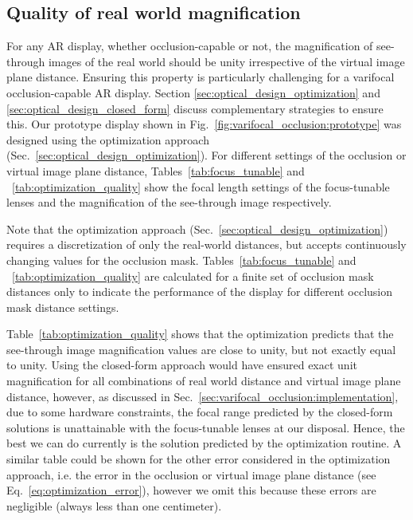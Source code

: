 \subsection{Quality of real world magnification}
\label{sec:results_optimization_quality}
For any AR display, whether occlusion-capable or not, the magnification of see-through images of the real world should be unity irrespective of the virtual image plane distance. Ensuring this property is particularly challenging for a varifocal occlusion-capable AR display. Section \ref{sec:optical_design_optimization} and \ref{sec:optical_design_closed_form} discuss complementary strategies to ensure this. Our prototype display shown in Fig.~\ref{fig:varifocal_occlusion:prototype} was designed using the optimization approach (Sec.~\ref{sec:optical_design_optimization}). For different settings of the occlusion or virtual image plane distance, Tables~\ref{tab:focus_tunable} and ~\ref{tab:optimization_quality} show the focal length settings of the focus-tunable lenses and the magnification of the see-through image respectively. 

Note that the optimization approach (Sec.~\ref{sec:optical_design_optimization}) requires a discretization of only the real-world distances, but accepts continuously changing values for the occlusion mask. Tables~\ref{tab:focus_tunable} and ~\ref{tab:optimization_quality} are calculated for a finite set of occlusion mask distances only to indicate the performance of the display for different occlusion mask distance settings.

Table~\ref{tab:optimization_quality} shows that the optimization predicts that the see-through image magnification values are close to unity, but not exactly equal to unity. Using the closed-form approach would have ensured exact unit magnification for all combinations of real world distance and virtual image plane distance, however, as discussed in Sec.~\ref{sec:varifocal_occlusion:implementation}, due to some hardware constraints, the focal range predicted by the closed-form solutions is unattainable with the focus-tunable lenses at our disposal. Hence, the best we can do currently is the solution predicted by the optimization routine. A similar table could be shown for the other error considered in the optimization approach, i.e. the error in the occlusion or virtual image plane distance (see Eq.~\ref{eq:optimization_error}), however we omit this because these errors are negligible (always less than one centimeter). 

